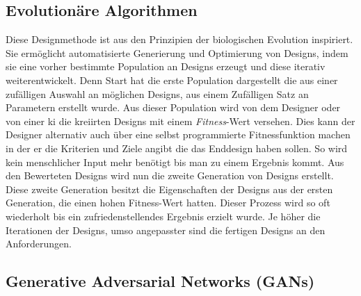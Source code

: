 \subsection*{Evolutionäre Algorithmen}
Diese Designmethode ist aus den Prinzipien der biologischen Evolution inspiriert. Sie ermöglicht automatisierte Generierung und Optimierung von Designs, indem sie eine vorher bestimmte Population an Designs erzeugt und diese iterativ weiterentwickelt.
Denn Start hat die erste Population dargestellt die aus einer zufälligen Auswahl an möglichen Designs, aus einem Zufälligen Satz an Parametern erstellt wurde. Aus dieser Population wird von dem Designer oder von einer \ac*{ki} die kreiirten Designs mit einem \textit{Fitness}-Wert versehen. Dies kann der Designer alternativ auch über eine selbst programmierte Fitnessfunktion machen in der er die Kriterien und Ziele angibt die das Enddesign haben sollen. So wird kein menschlicher Input mehr benötigt bis man zu einem Ergebnis kommt. Aus den Bewerteten Designs wird nun die zweite Generation von Designs erstellt. Diese zweite Generation besitzt die Eigenschaften der Designs aus der ersten Generation, die einen hohen Fitness-Wert hatten. Dieser Prozess wird so oft wiederholt bis ein zufriedenstellendes Ergebnis erzielt wurde. Je höher die Iterationen der Designs, umso angepasster sind die fertigen Designs an den Anforderungen. 

\subsection*{Generative Adversarial Networks (GANs)}

